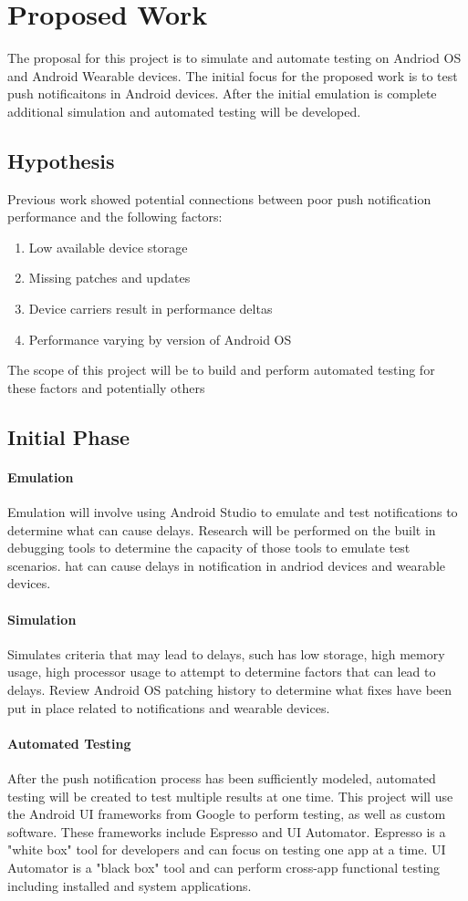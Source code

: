 \section{Proposed Work}
The proposal for this project is to simulate and automate testing on Andriod OS and Android Wearable devices. 
The initial focus for the proposed work is to test push notificaitons in Android devices. 
After the initial emulation is complete additional simulation and automated testing will be developed.
\subsection{Hypothesis}
Previous work\cite{sultana_wearable_nodate} showed potential connections between poor push notification performance and the following factors:
\begin{enumerate}
 \item Low available device storage
 \item Missing patches and updates 
 \item Device carriers result in performance deltas
 \item Performance varying by version of Android OS
\end{enumerate}
The scope of this project will be to build and perform automated testing for these factors and potentially others
\subsection{Initial Phase}
\paragraph{Emulation}
Emulation will involve using Android Studio to emulate and test notifications to determine what can cause delays.
Research will be performed on the built in debugging tools to determine the capacity of those tools to emulate test scenarios.
hat can cause delays in notification in andriod devices and wearable devices.
\paragraph{Simulation}
Simulates criteria that may lead to delays, such has low storage, high memory usage, high processor usage to attempt to determine factors that can lead to delays.
Review Android OS patching history to determine what fixes have been put in place related to notifications and wearable devices.
\paragraph{Automated Testing}
After the push notification process has been sufficiently modeled, automated testing will be created to test multiple results at one time. 
This project will use the Android UI frameworks from Google to perform testing, as well as custom software.
These frameworks include Espresso\cite{noauthor_espresso_nodate} and UI Automator\cite{noauthor_ui_nodate}.
Espresso is a "white box" tool for developers and can focus on testing one app at a time.
UI Automator is a "black box" tool and can perform cross-app functional testing including installed and system applications.

